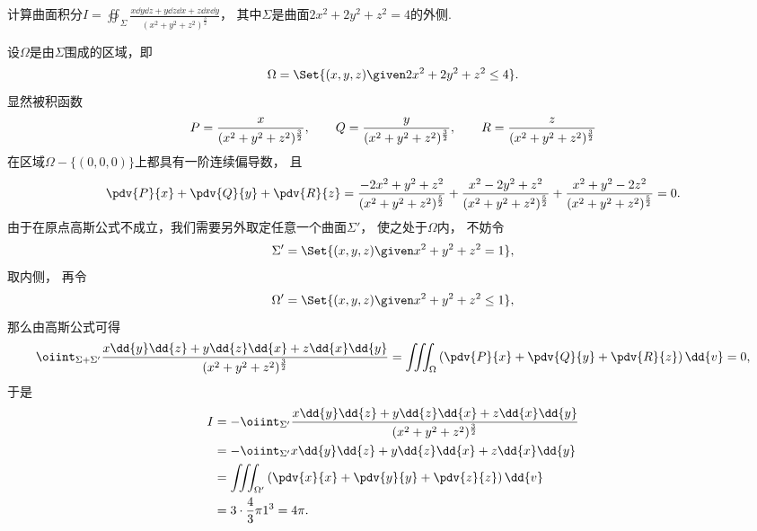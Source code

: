 \begin{example}
计算曲面积分\(I = \oiint_\Sigma \frac{x \dd{y}\dd{z} + y \dd{z}\dd{x} + z \dd{x}\dd{y}}{(x^2+y^2+z^2)^{\frac32}}\)，
其中\(\Sigma\)是曲面\(2x^2+2y^2+z^2=4\)的外侧.
\begin{solution}
设\(\Omega\)是由\(\Sigma\)围成的区域，即\begin{equation*}
	\Omega = \Set{ (x,y,z) \given 2x^2+2y^2+z^2\leq4 }.
\end{equation*}
显然被积函数\begin{equation*}
	\def\fA#1{\frac{#1}{(x^2+y^2+z^2)^{\frac32}}}
	P=\fA{x},
	\qquad
	Q=\fA{y},
	\qquad
	R=\fA{z}
\end{equation*}在区域\(\Omega-\{(0,0,0)\}\)上都具有一阶连续偏导数，
且\begin{equation*}
	\def\A{(x^2+y^2+z^2)^{\frac52}}
	\pdv{P}{x} + \pdv{Q}{y} + \pdv{R}{z}
	= \frac{-2x^2+y^2+z^2}{\A}
	+ \frac{x^2-2y^2+z^2}{\A}
	+ \frac{x^2+y^2-2z^2}{\A}
	= 0.
\end{equation*}
由于在原点高斯公式不成立，我们需要另外取定任意一个曲面\(\Sigma'\)，
使之处于\(\Omega\)内，
不妨令\begin{equation*}
	\Sigma' = \Set{ (x,y,z) \given x^2+y^2+z^2=1 },
\end{equation*}
取内侧，
再令\begin{equation*}
	\Omega' = \Set{ (x,y,z) \given x^2+y^2+z^2\leq1 },
\end{equation*}
那么由高斯公式可得\begin{equation*}
	\oiint_{\Sigma+\Sigma'} \frac{x \dd{y}\dd{z} + y \dd{z}\dd{x} + z \dd{x}\dd{y}}{(x^2+y^2+z^2)^{\frac32}}
	= \iiint_\Omega \left( \pdv{P}{x} + \pdv{Q}{y} + \pdv{R}{z} \right) \dd{v}
	= 0,
\end{equation*}
于是\begin{align*}
	I &= -\oiint_{\Sigma'} \frac{x \dd{y}\dd{z} + y \dd{z}\dd{x} + z \dd{x}\dd{y}}{(x^2+y^2+z^2)^{\frac32}} \\
	&= -\oiint_{\Sigma'} x \dd{y}\dd{z} + y \dd{z}\dd{x} + z \dd{x}\dd{y} \\
	&= \iiint_{\Omega'} \left( \pdv{x}{x} + \pdv{y}{y} + \pdv{z}{z} \right) \dd{v} \\
	&= 3 \cdot \frac43 \pi 1^3
	= 4\pi.
\end{align*}
\end{solution}
\end{example}
